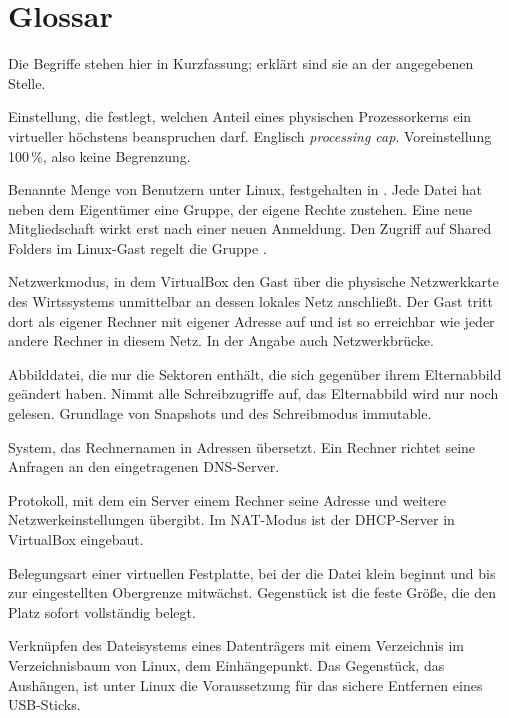 \chapter{Glossar}
\label{kap:glossar}

Die Begriffe stehen hier in Kurzfassung; erklärt sind sie an der angegebenen Stelle.

\begin{glossar}

Einstellung, die festlegt, welchen Anteil eines physischen Prozessorkerns ein virtueller höchstens beanspruchen darf. Englisch \emph{processing cap}. Voreinstellung 100\,\%, also keine Begrenzung.

Benannte Menge von Benutzern unter Linux, festgehalten in . Jede Datei hat neben dem Eigentümer eine Gruppe, der eigene Rechte zustehen. Eine neue Mitgliedschaft wirkt erst nach einer neuen Anmeldung. Den Zugriff auf Shared Folders im Linux-Gast regelt die Gruppe .

Netzwerkmodus, in dem VirtualBox den Gast über die physische Netzwerkkarte des Wirtssystems unmittelbar an dessen lokales Netz anschließt. Der Gast tritt dort als eigener Rechner mit eigener Adresse auf und ist so erreichbar wie jeder andere Rechner in diesem Netz. In der Angabe auch Netzwerkbrücke.

Abbilddatei, die nur die Sektoren enthält, die sich gegenüber ihrem Elternabbild geändert haben. Nimmt alle Schreibzugriffe auf, das Elternabbild wird nur noch gelesen. Grundlage von Snapshots und des Schreibmodus immutable.

System, das Rechnernamen in Adressen übersetzt. Ein Rechner richtet seine Anfragen an den eingetragenen DNS-Server.

Protokoll, mit dem ein Server einem Rechner seine Adresse und weitere Netzwerkeinstellungen übergibt. Im NAT-Modus ist der DHCP-Server in VirtualBox eingebaut.

Belegungsart einer virtuellen Festplatte, bei der die Datei klein beginnt und bis zur eingestellten Obergrenze mitwächst. Gegenstück ist die feste Größe, die den Platz sofort vollständig belegt.

Verknüpfen des Dateisystems eines Datenträgers mit einem Verzeichnis im Verzeichnisbaum von Linux, dem Einhängepunkt. Das Gegenstück, das Aushängen, ist unter Linux die Voraussetzung für das sichere Entfernen eines USB-Sticks.


\end{glossar}
